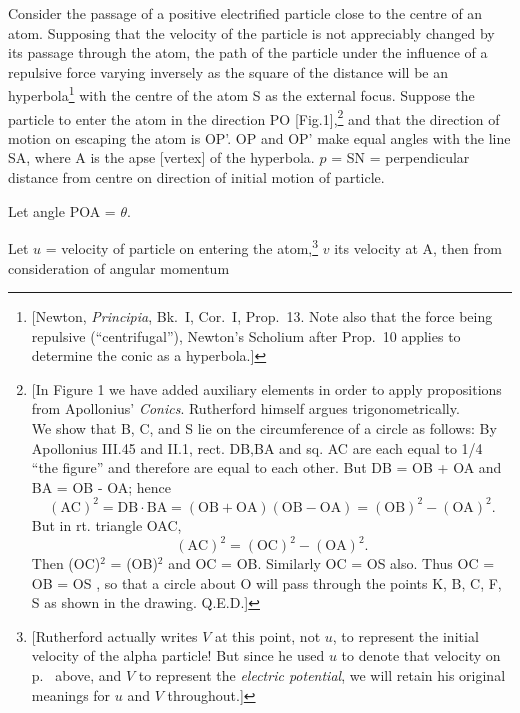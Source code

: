 Consider the passage of a positive electrified particle close to the
centre of an atom. Supposing that the velocity of the particle is not
appreciably changed by its passage through the atom, the path of the
particle under the influence of a repulsive force varying inversely as
the square of the distance will be an hyperbola\footnote{{[}Newton,
  \emph{Principia}, Bk.~I, Cor.~I, Prop.~13. Note also that the force being
  repulsive (``centrifugal''), Newton's Scholium after Prop.\ 10 applies
  to determine the conic as a hyperbola.{]}} with the centre of the atom
S as the external focus. Suppose the particle to enter the atom in the
direction PO {[}Fig.1{]},\footnote{{[}In Figure 1 we have added
  auxiliary elements in order to apply propositions from Apollonius'
  \emph{Conics}. Rutherford himself argues trigonometrically.\\
  We show that B, C, and S lie on the circumference of a circle as follows: 
  By Apollonius III.45 and II.1,
  rect. DB,BA and sq. AC are each equal to 1/4 ``the figure'' and
  therefore are equal to each other. But DB = OB + OA and BA = OB - OA;
  hence\\
	\begin{equation*}
   (\text{AC})^2 = \text{DB} \cdot \text{BA} = (\text{OB} + \text{OA})(\text{OB} - \text{OA}) = (\text{OB})^2 - (\text{OA})^2 .
	\end{equation*}
  But in rt. triangle OAC,
  \begin{equation*}
  (\text{AC})^2 = (\text{OC})^2 - (\text{OA})^2 .
  \end{equation*}
  Then (OC)$^2$ = (OB)$^2$ and OC = OB. Similarly OC = OS also. Thus OC = OB =
  OS , so that a circle about O will pass through the points K, B, C, F,
  S as shown in the drawing. Q.E.D.{]}} and that the direction of motion
on escaping the atom is OP'. OP and OP' make equal angles with the line
SA, where A is the apse {[}vertex{]} of the hyperbola. $p$ = SN =
perpendicular distance from centre on direction of initial motion of
particle.

Let angle POA = $\theta$.

Let $u$ = velocity of particle on entering the atom,\footnote{{[}Rutherford
  actually writes $V$ at this point, not $u$, to represent the
  initial velocity of the alpha particle! But since he used $u$ to
  denote that velocity on p.~\pageref{uRuth} above, and $V$ to represent the
  \emph{electric potential}, we will retain his original meanings for
  $u$ and $V$ throughout.{]}} $v$ its velocity at A, then
from consideration of angular momentum

